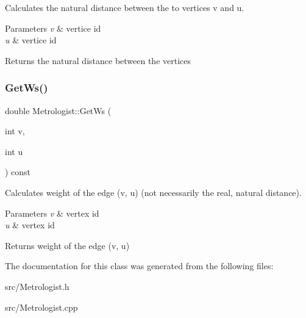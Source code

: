 Calculates the natural distance between the to vertices v and u. 


\begin{DoxyParams}{Parameters}
{\em v} & vertice id \\
\hline
{\em u} & vertice id \\
\hline
\end{DoxyParams}
\begin{DoxyReturn}{Returns}
the natural distance between the vertices 
\end{DoxyReturn}
\mbox{\label{classMetrologist_afca60025d9898f54849e8215752ce837}} 
\subsubsection{\texorpdfstring{Get\+Ws()}{GetWs()}}
{\footnotesize\ttfamily double Metrologist\+::\+Get\+Ws (\begin{DoxyParamCaption}\item[{int}]{v,  }\item[{int}]{u }\end{DoxyParamCaption}) const}



Calculates weight of the edge (v, u) (not necessarily the real, natural distance). 


\begin{DoxyParams}{Parameters}
{\em v} & vertex id \\
\hline
{\em u} & vertex id \\
\hline
\end{DoxyParams}
\begin{DoxyReturn}{Returns}
weight of the edge (v, u) 
\end{DoxyReturn}


The documentation for this class was generated from the following files\+:\begin{DoxyCompactItemize}
\item 
src/Metrologist.\+h\item 
src/Metrologist.\+cpp\end{DoxyCompactItemize}
